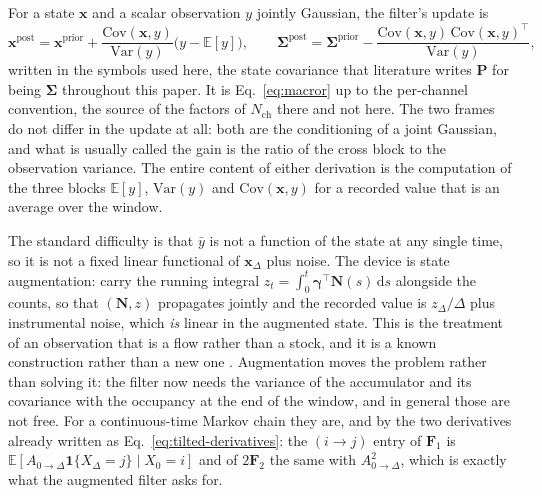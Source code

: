 \begin{appendixbox}
For a state $\mathbf{x}$ and a scalar observation $y$ jointly Gaussian, the filter's update is
\begin{equation}
  \mathbf{x}^{\mathrm{post}}=\mathbf{x}^{\mathrm{prior}}
    +\frac{\mathrm{Cov}(\mathbf{x},y)}{\mathrm{Var}(y)}\bigl(y-\mathbb{E}[y]\bigr),
  \qquad
  \bm{\Sigma}^{\mathrm{post}}=\bm{\Sigma}^{\mathrm{prior}}
    -\frac{\mathrm{Cov}(\mathbf{x},y)\,\mathrm{Cov}(\mathbf{x},y)^\top}{\mathrm{Var}(y)} ,
  \label{eq:kf}
\end{equation}
written in the symbols used here, the state covariance that literature writes $\mathbf{P}$ for
being $\bm{\Sigma}$ throughout this paper. It is Eq.~\ref{eq:macror} up to the per-channel convention, the source of the factors of
$N_{\mathrm{ch}}$ there and not here. The two frames do not differ in the update at all: both are
the conditioning of a joint Gaussian, and what is usually called the gain is the ratio of the cross
block to the observation variance. The entire content of either derivation is the computation of
the three blocks $\mathbb{E}[y]$, $\mathrm{Var}(y)$ and $\mathrm{Cov}(\mathbf{x},y)$ for a recorded
value that is an average over the window.

The standard difficulty is that $\bar y$ is not a function of the state at any single time, so it
is not a fixed linear functional of $\mathbf{x}_\Delta$ plus noise. The device is
state augmentation: carry the running integral
$z_t=\int_0^{t}\bm{\gamma}^\top\mathbf{N}(s)\,\mathrm{d}s$ alongside the counts, so that
$(\mathbf{N},z)$ propagates jointly and the recorded value is $z_\Delta/\Delta$ plus instrumental
noise, which \emph{is} linear in the augmented state. This is the treatment of an observation that
is a flow rather than a stock, and it is a known construction rather than a new one
\citep{zadrozny1988gaussian}. Augmentation moves the problem rather than solving it: the filter now
needs the variance of the accumulator and its covariance with the occupancy at the end of the
window, and in general those are not free. For a continuous-time Markov chain they are, and by the
two derivatives already written as Eq.~\ref{eq:tilted-derivatives}: the $(i\to j)$ entry of
$\mathbf{F}_1$ is $\mathbb{E}[A_{0\to\Delta}\mathbf{1}\{X_\Delta=j\}\mid X_0=i]$ and of
$2\mathbf{F}_2$ the same with $A^2_{0\to\Delta}$, which is exactly what the augmented filter asks for.


\end{appendixbox}
